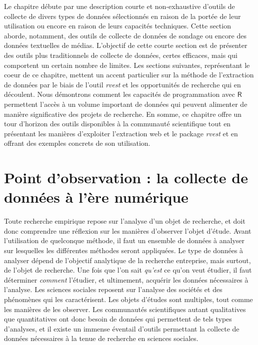 \documentclass[
  letterpaper,
  DIV=11,
  numbers=noendperiod,
  oneside]{scrreprt}
\begin{document}
Le chapitre débute par une description courte et non-exhaustive d'outils
de collecte de divers types de données sélectionnés en raison de la
portée de leur utilisation ou encore en raison de leurs capacités
techniques. Cette section aborde, notamment, des outils de collecte de
données de sondage ou encore des données textuelles de médias.
L'objectif de cette courte section est de présenter des outils plus
traditionnels de collecte de données, certes efficaces, mais qui
comportent un certain nombre de limites. Les sections suivantes,
représentant le coeur de ce chapitre, mettent un accent particulier sur
la méthode de l'extraction de données par le biais de l'outil
\emph{rvest} et les opportunités de recherche qui en découlent. Nous
démontrons comment les capacités de programmation avec \(\textsf{R}\)
permettent l'accès à un volume important de données qui peuvent
alimenter de manière significative des projets de recherche. En somme,
ce chapitre offre un tour d'horizon des outils disponibles à la
communauté scientifique tout en présentant les manières d'exploiter
l'extraction web et le package \emph{rvest} et en offrant des exemples
concrets de son utilisation.

\hypertarget{point-dobservation-la-collecte-de-donnuxe9es-uxe0-luxe8re-numuxe9rique}{%
\section{Point d'observation : la collecte de données à l'ère
numérique}\label{point-dobservation-la-collecte-de-donnuxe9es-uxe0-luxe8re-numuxe9rique}}

Toute recherche empirique repose sur l'analyse d'un objet de recherche,
et doit donc comprendre une réflexion sur les manières d'observer
l'objet d'étude. Avant l'utilisation de quelconque méthode, il faut un
ensemble de données à analyser sur lesquelles les différentes méthodes
seront appliquées. Le type de données à analyser dépend de l'objectif
analytique de la recherche entreprise, mais surtout, de l'objet de
recherche. Une fois que l'on sait \emph{qu'est} ce qu'on veut étudier,
il faut déterminer \emph{comment} l'étudier, et ultimement, acquérir les
données nécessaires à l'analyse. Les sciences sociales reposent sur
l'analyse des sociétés et des phénomènes qui les caractérisent. Les
objets d'études sont multiples, tout comme les manières de les observer.
Les communautés scientifiques autant qualitatives que quantitatives ont
donc besoin de données qui permettent de tels types d'analyses, et il
existe un immense éventail d'outils permettant la collecte de données
nécessaires à la tenue de recherche en sciences sociales.
\end{document}
